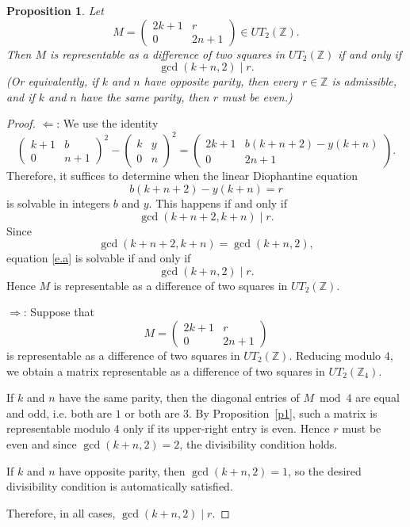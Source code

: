 \documentclass[11pt]{amsart}
\newtheorem{proposition}[theorem]{Proposition}
\def\Z{\mathbb{Z}}
\begin{document}
\begin{proposition}\label{prop:odd-diagonal}
Let
$$M=\begin{pmatrix}2k+1&r\\0&2n+1\end{pmatrix}\in UT_2(\Z).$$
Then $M$ is representable as a difference of two squares in $UT_2(\Z)$ if and only if
$$\gcd(k+n,2)\mid r.$$
(Or equivalently, 
 if $k$ and $n$ have opposite parity, then every $r\in\mathbb Z$ is admissible, and  if $k$ and $n$ have the same parity, then $r$ must be even.)
\end{proposition}
\begin{proof} $\boxed{\Leftarrow}$:
We use the identity
\[
\begin{pmatrix}
k + 1& b\\ 0& n + 1
\end{pmatrix}^2-
\begin{pmatrix}
k & y\\ 0& n
\end{pmatrix}^2
=
\begin{pmatrix}
2k+1 & b(k+n+2)-y(k+n)\\
0 & 2n+1
\end{pmatrix}.
\]
Therefore, it suffices to determine when the linear Diophantine equation
\begin{equation}\label{e.a}
b(k+n+2)-y(k+n)=r
\end{equation}
is solvable in integers $b$ and $y$. This happens if and only if
\[
\gcd(k+n+2,k+n)\mid r.
\]
Since
\[
\gcd(k+n+2,k+n)=\gcd(k+n,2),
\]
equation \eqref{e.a} is solvable if and only if
\[
\gcd(k+n,2)\mid r.
\]
Hence $M$ is representable as a difference of two squares in $UT_2(\mathbb Z)$.

$\boxed{\Rightarrow}$:
Suppose that
\[
M=\begin{pmatrix}2k+1&r\\0&2n+1\end{pmatrix}
\]
is representable as a difference of two squares in $UT_2(\mathbb Z)$. Reducing modulo $4$, we obtain a matrix representable as a difference of two squares in $UT_2(\mathbb Z_4)$.

If $k$ and $n$ have the same parity, then the diagonal entries of $M \bmod 4$ are equal and odd, i.e. both are $1$ or both are $3$. By Proposition~\ref{p1}, such a matrix is representable modulo $4$ only if its upper-right entry is even. Hence $r$ must be even and since $\gcd(k+n,2)=2$, the divisibility condition holds.

If $k$ and $n$ have opposite parity, then $\gcd(k+n,2)=1$, so the desired divisibility condition is automatically satisfied.

Therefore, in all cases, $\gcd(k+n,2)\mid r.$
\end{proof}
\end{document}
